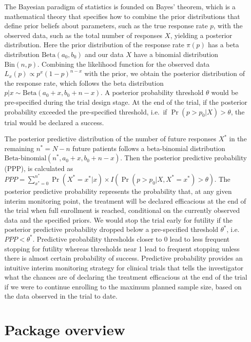 The Bayesian paradigm of statistics is founded on Bayes' theorem, which is a mathematical theory that specifies how to combine the prior distributions that define prior beliefs about parameters, such as the true response rate \(p\), with the observed data, such as the total number of responses \(X\), yielding a posterior distribution. Here the prior distribution of the response rate \(\pi(p)\) has a beta distribution \(\mbox{Beta}(a_0, b_0)\) and our data \(X\) have a binomial distribution \(\mbox{Bin}(n, p)\). Combining the likelihood function for the observed data \(L_x(p) \propto p^x (1-p)^{n-x}\) with the prior, we obtain the posterior distribution of the response rate, which follows the beta distribution \(p|x \sim \mbox{Beta}(a_0 + x, b_0 + n - x)\). A posterior probability threshold \(\theta\) would be pre-specified during the trial design stage. At the end of the trial, if the posterior probability exceeded the pre-specified threshold, i.e.~if \(\Pr(p>p_0 | X) > \theta\), the trial would be declared a success.

The posterior predictive distribution of the number of future responses \(X^*\) in the remaining \(n^*=N-n\) future patients follows a beta-binomial distribution \(\mbox{Beta-binomial}(n^*, a_0 + x, b_0 + n - x)\). Then the posterior predictive probability (PPP), is calculated as \(PPP = \sum_{{x^*}=0}^{n^*} \Pr(X^*=x^*|x) \times I(\Pr(p>p_0 | X, X^*=x^*) > \theta)\). The posterior predictive probability represents the probability that, at any given interim monitoring point, the treatment will be declared efficacious at the end of the trial when full enrollment is reached, conditional on the currently observed data and the specified priors. We would stop the trial early for futility if the posterior predictive probability dropped below a pre-specified threshold \(\theta^*\), i.e.~\(PPP<\theta^*\). Predictive probability thresholds closer to 0 lead to less frequent stopping for futility whereas thresholds near 1 lead to frequent stopping unless there is almost certain probability of success. Predictive probability provides an intuitive interim monitoring strategy for clinical trials that tells the investigator what the chances are of declaring the treatment efficacious at the end of the trial if we were to continue enrolling to the maximum planned sample size, based on the data observed in the trial to date.

\hypertarget{package-overview}{%
\section{Package overview}\label{package-overview}}


